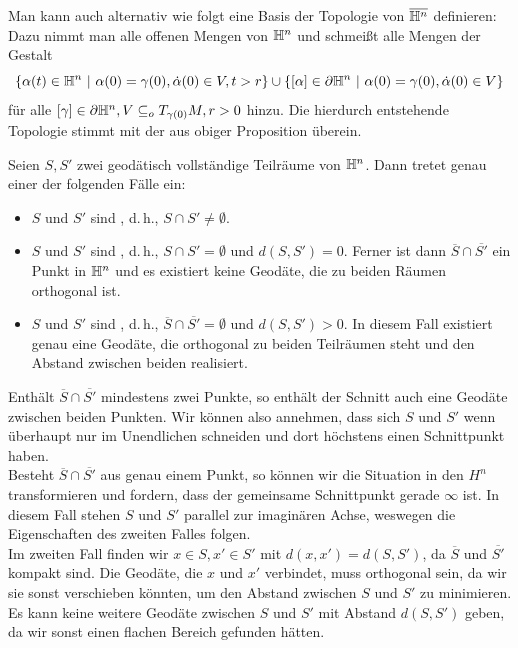\documentclass{book}
\begin{document}
\Bem{}
Man kann auch alternativ wie folgt eine Basis der Topologie von $\overline{\mathbb{H}^n}$ definieren: Dazu nimmt man alle offenen Mengen von $\mathbb{H}^n$ und schmeißt alle Mengen der Gestalt
\[ \{ \alpha(t) \in \H^n~|~ \alpha(0) = \gamma(0), \dot{\alpha}(0)  \in V ,t > r\} \cup \set{ [\alpha] \in \partial \H^n }{\alpha(0) = \gamma(0),\dot{\alpha}(0)  \in V} \]
für alle $[\gamma] \in \partial \mathbb{H}^n, V \subseteq_o T_{\gamma(0)}M, r > 0$ hinzu. Die hierdurch entstehende Topologie stimmt mit der aus obiger Proposition überein.

\Prop{}
Seien $S,S'$ zwei geodätisch vollständige Teilräume von $\mathbb{H}^n$. Dann tretet genau einer der folgenden Fälle ein:
\begin{itemize}
	\item $S$ und $S'$ sind , d.\,h., $S\cap S'\neq \emptyset$.
	\item $S$ und $S'$ sind , d.\,h., $S\cap S' = \emptyset$ und $d(S, S') = 0$. Ferner ist dann $\overline{S} \cap \overline{S'}$ ein Punkt in $\mathbb{H}^n$ und es existiert keine Geodäte, die zu beiden Räumen orthogonal ist.
	\item $S$ und $S'$ sind , d.\,h., $\overline{S}\cap \overline{S'} = \emptyset$ und $d(S, S') > 0$. In diesem Fall existiert genau eine Geodäte, die orthogonal zu beiden Teilräumen steht und den Abstand zwischen beiden realisiert.
\end{itemize}
\begin{Beweis}{}
	Enthält $\overline{S} \cap \overline{S'}$ mindestens zwei Punkte, so enthält der Schnitt auch eine Geodäte zwischen beiden Punkten. Wir können also annehmen, dass sich $S$ und $S'$ wenn überhaupt nur im Unendlichen schneiden und dort höchstens einen Schnittpunkt haben.\\
	Besteht $\overline{S} \cap \overline{S'}$ aus genau einem Punkt, so können wir die Situation in den $H^n$ transformieren und fordern, dass der gemeinsame Schnittpunkt gerade $\infty$ ist. In diesem Fall stehen $S$ und $S'$ parallel zur imaginären Achse, weswegen die Eigenschaften des zweiten Falles folgen.\\
	Im zweiten Fall finden wir $x\in S, x' \in S'$ mit $d(x,x') = d(S, S')$, da $\overline{S}$ und $\overline{S'}$ kompakt sind. Die Geodäte, die $x$ und $x'$ verbindet, muss orthogonal sein, da wir sie sonst verschieben könnten, um den Abstand zwischen $S$ und $S'$ zu minimieren. Es kann keine weitere Geodäte zwischen $S$ und $S'$ mit Abstand $d(S, S')$ geben, da wir sonst einen flachen Bereich gefunden hätten.
\end{Beweis}
\end{document}
